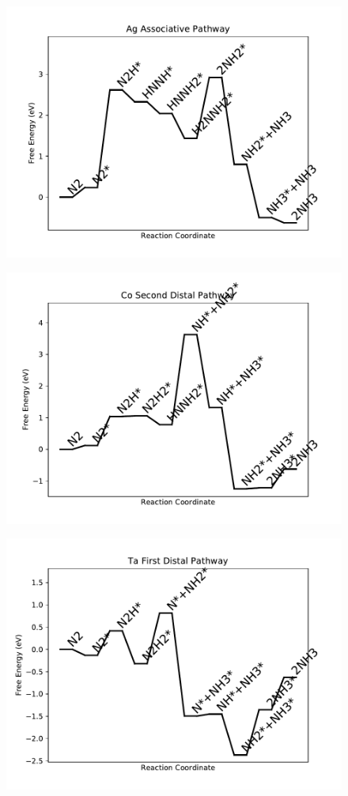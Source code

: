 \begin{figure}
\includegraphics[width=0.8\linewidth]{data/plots/Ag_associative.pdf}
\label{fig:Ag_associative}
\end{figure}

\begin{figure}
\includegraphics[width=0.8\linewidth]{data/plots/Co_distal_2.pdf}
\label{fig:Co_distal_2}
\end{figure}

\begin{figure}
\includegraphics[width=0.8\linewidth]{data/plots/Ta_distal_1.pdf}
\label{fig:Ta_distal_1}
\end{figure}

